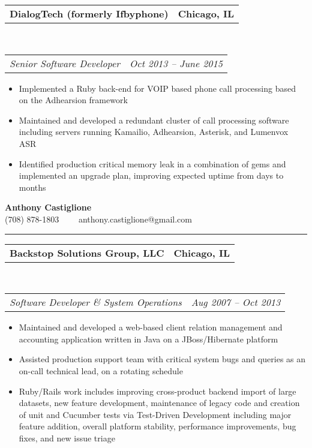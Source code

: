 \documentclass[10pt,letterpaper]{article}
\makeatletter
\newcommand{\headerrow}[2]
{\begin{tabular*}{\linewidth}{l@{\extracolsep{\fill}}r}
  #1 &
  #2 \\
\end{tabular*}}
\newenvironment{indentsection}[1]%
{\begin{list}{}%
  {\setlength{\leftmargin}{#1}}%
  \item[]%
}
{\end{list}}
\makeatother
\begin{document}
\begin{indentsection}{\parindent}
  \headerrow
    {\textbf{DialogTech (formerly Ifbyphone)} }
    {\textbf{Chicago, IL}}
  \\
  \headerrow
    {\emph{Senior Software Developer}}
    {\emph{Oct 2013 -- June 2015}}

  \begin{itemize}
  \renewcommand{\labelitemi}{$-$}
  \vspace{-0.1in}
    \item Implemented a Ruby back-end for VOIP based phone call processing based on the Adhearsion framework
    \item Maintained and developed a redundant cluster of call processing software including servers running Kamailio, Adhearsion, Asterisk, and Lumenvox ASR
    \item Identified production critical memory leak in a combination of gems and implemented an upgrade plan, improving expected uptime from days to months
  \end{itemize}
\end{indentsection}
\pagebreak
\begin{center}
  {\LARGE \textbf {Anthony Castiglione}} \\ (708) 878-1803 \ \ \textbullet \ \ anthony.castiglione@gmail.com
\end{center}
\hrule
\vspace{0.2in}
\begin{indentsection}{\parindent}
  \headerrow
    {\textbf{Backstop Solutions Group, LLC} }
    {\textbf{Chicago, IL}}
  \\
  \headerrow
    {\emph{Software Developer \& System Operations}}
    {\emph{Aug 2007 -- Oct 2013}}

  \begin{itemize}
  \renewcommand{\labelitemi}{$-$}
  \vspace{-0.1in}
    \item Maintained and developed a web-based client relation management and accounting application written in Java on a JBoss/Hibernate platform
    \item Assisted production support team with critical system bugs and queries as an on-call technical lead, on a rotating schedule
    \item Ruby/Rails work includes improving cross-product backend import of large datasets, new feature development, maintenance of legacy code and creation of unit and Cucumber tests via Test-Driven Development including major feature addition, overall platform stability, performance improvements, bug fixes, and new issue triage
  \end{itemize}
\end{indentsection}
\end{document}
